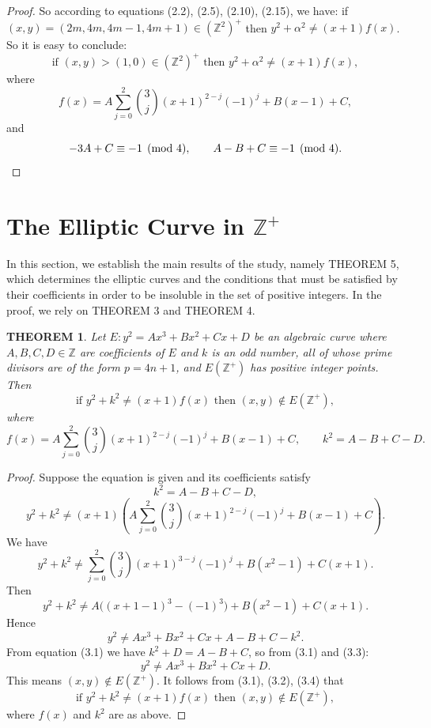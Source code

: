 \documentclass[11pt]{amsart}
\newtheorem{theorem}{THEOREM}
\begin{document}
\begin{proof}
So according to equations (2.2), (2.5), (2.10), (2.15), we have: if $(x,y)=(2m,4m,4m-1,4m+1)\in(\mathbb{Z}^2)^+$ then $y^2+\alpha^2\ne(x+1)f(x)$. So it is easy to conclude:
\[
\text{if } (x,y)>(1,0)\in(\mathbb{Z}^2)^+ \text{ then } y^2+\alpha^2 \ne (x+1)f(x),
\]
where
\[
f(x) = A\sum_{j=0}^2\binom3j(x+1)^{2-j}(-1)^j + B(x-1)+C,
\]
and
\[
-3A+C\equiv -1\pmod4, \qquad A-B+C\equiv -1\pmod4. \qedhere
\]
\end{proof}

\section{The Elliptic Curve in $\mathbb{Z}^+$}

In this section, we establish the main results of the study, namely THEOREM 5, which determines the elliptic curves and the conditions that must be satisfied by their coefficients in order to be insoluble in the set of positive integers. In the proof, we rely on THEOREM 3 and THEOREM 4.

\begin{theorem}\label{thm4}
Let $E: y^2 = Ax^3+Bx^2+Cx+D$ be an algebraic curve where $A,B,C,D\in\mathbb{Z}$ are coefficients of $E$ and $k$ is an odd number, all of whose prime divisors are of the form $p=4n+1$, and $E(\mathbb{Z}^+)$ has positive integer points. Then
\[
\text{if } y^2+k^2 \ne (x+1)f(x) \text{ then } (x,y)\notin E(\mathbb{Z}^+),
\]
where
\[
f(x) = A\sum_{j=0}^2\binom3j(x+1)^{2-j}(-1)^j+B(x-1)+C, \qquad k^2 = A-B+C-D.
\]
\end{theorem}

\begin{proof}
Suppose the equation is given and its coefficients satisfy
\begin{equation}
k^2 = A-B+C-D, \tag{3.1}
\end{equation}
\begin{equation}
y^2+k^2 \ne (x+1)\left(A\sum_{j=0}^2\binom3j(x+1)^{2-j}(-1)^j+B(x-1)+C\right). \tag{3.2}
\end{equation}
We have
\[
y^2+k^2 \ne \sum_{j=0}^2\binom3j(x+1)^{3-j}(-1)^j + B(x^2-1)+C(x+1).
\]
Then
\[
y^2+k^2 \ne A\big((x+1-1)^3-(-1)^3\big)+B(x^2-1)+C(x+1).
\]
Hence
\begin{equation}
y^2 \ne Ax^3+Bx^2+Cx+A-B+C-k^2. \tag{3.3}
\end{equation}
From equation (3.1) we have $k^2+D=A-B+C$, so from (3.1) and (3.3):
\[
y^2 \ne Ax^3+Bx^2+Cx+D. \tag{3.4}
\]
This means $(x,y)\notin E(\mathbb{Z}^+)$. It follows from (3.1), (3.2), (3.4) that
\[
\text{if } y^2+k^2\ne(x+1)f(x) \text{ then } (x,y)\notin E(\mathbb{Z}^+),
\]
where $f(x)$ and $k^2$ are as above. \qedhere
\end{proof}
\end{document}
